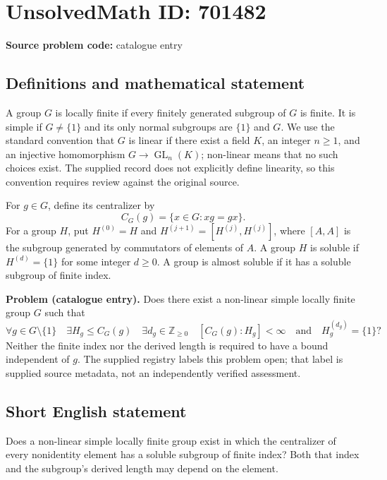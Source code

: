 \documentclass[11pt]{article}
\begin{document}
\section*{UnsolvedMath ID: 701482}
\textbf{Source problem code:} catalogue entry
\subsection{Definitions and mathematical statement}
A group \(G\) is locally finite if every finitely generated subgroup of \(G\) is finite. It is simple if \(G\neq\{1\}\) and its only normal subgroups are \(\{1\}\) and \(G\). We use the standard convention that \(G\) is linear if there exist a field \(K\), an integer \(n\geq 1\), and an injective homomorphism \(G\to\operatorname{GL}_n(K)\); non-linear means that no such choices exist. The supplied record does not explicitly define linearity, so this convention requires review against the original source.

For \(g\in G\), define its centralizer by
\[
C_G(g)=\{x\in G:xg=gx\}.
\]
For a group \(H\), put \(H^{(0)}=H\) and \(H^{(j+1)}=[H^{(j)},H^{(j)}]\), where \([A,A]\) is the subgroup generated by commutators of elements of \(A\). A group \(H\) is soluble if \(H^{(d)}=\{1\}\) for some integer \(d\geq 0\). A group is almost soluble if it has a soluble subgroup of finite index.

\textbf{Problem (catalogue entry).} Does there exist a non-linear simple locally finite group \(G\) such that
\[
\forall g\in G\setminus\{1\}\quad
\exists H_g\leq C_G(g)\quad
\exists d_g\in\mathbb Z_{\geq 0}\quad
[C_G(g):H_g]<\infty
\quad\text{and}\quad
H_g^{(d_g)}=\{1\}?
\]
Neither the finite index nor the derived length is required to have a bound independent of \(g\). The supplied registry labels this problem open; that label is supplied source metadata, not an independently verified assessment.
\subsection{Short English statement}
Does a non-linear simple locally finite group exist in which the centralizer of every nonidentity element has a soluble subgroup of finite index? Both that index and the subgroup's derived length may depend on the element.
\end{document}
